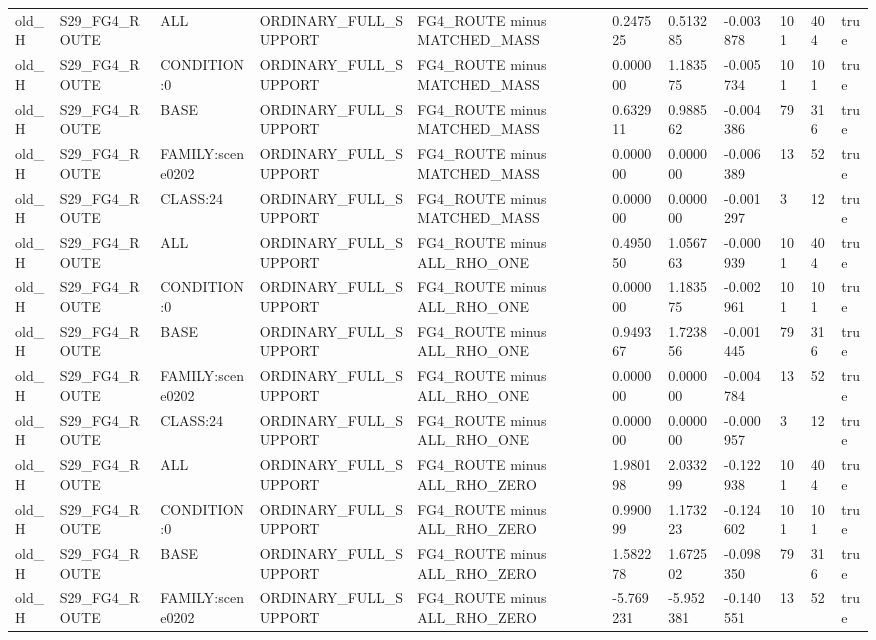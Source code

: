 \begin{tabular}{lllllllllll}
old\_H & S29\_FG4\_ROUTE & ALL & ORDINARY\_FULL\_SUPPORT & FG4\_ROUTE minus MATCHED\_MASS & 0.247525 & 0.513285 & -0.003878 & 101 & 404 & true \\
old\_H & S29\_FG4\_ROUTE & CONDITION:0 & ORDINARY\_FULL\_SUPPORT & FG4\_ROUTE minus MATCHED\_MASS & 0.000000 & 1.183575 & -0.005734 & 101 & 101 & true \\
old\_H & S29\_FG4\_ROUTE & BASE & ORDINARY\_FULL\_SUPPORT & FG4\_ROUTE minus MATCHED\_MASS & 0.632911 & 0.988562 & -0.004386 & 79 & 316 & true \\
old\_H & S29\_FG4\_ROUTE & FAMILY:scene0202 & ORDINARY\_FULL\_SUPPORT & FG4\_ROUTE minus MATCHED\_MASS & 0.000000 & 0.000000 & -0.006389 & 13 & 52 & true \\
old\_H & S29\_FG4\_ROUTE & CLASS:24 & ORDINARY\_FULL\_SUPPORT & FG4\_ROUTE minus MATCHED\_MASS & 0.000000 & 0.000000 & -0.001297 & 3 & 12 & true \\
old\_H & S29\_FG4\_ROUTE & ALL & ORDINARY\_FULL\_SUPPORT & FG4\_ROUTE minus ALL\_RHO\_ONE & 0.495050 & 1.056763 & -0.000939 & 101 & 404 & true \\
old\_H & S29\_FG4\_ROUTE & CONDITION:0 & ORDINARY\_FULL\_SUPPORT & FG4\_ROUTE minus ALL\_RHO\_ONE & 0.000000 & 1.183575 & -0.002961 & 101 & 101 & true \\
old\_H & S29\_FG4\_ROUTE & BASE & ORDINARY\_FULL\_SUPPORT & FG4\_ROUTE minus ALL\_RHO\_ONE & 0.949367 & 1.723856 & -0.001445 & 79 & 316 & true \\
old\_H & S29\_FG4\_ROUTE & FAMILY:scene0202 & ORDINARY\_FULL\_SUPPORT & FG4\_ROUTE minus ALL\_RHO\_ONE & 0.000000 & 0.000000 & -0.004784 & 13 & 52 & true \\
old\_H & S29\_FG4\_ROUTE & CLASS:24 & ORDINARY\_FULL\_SUPPORT & FG4\_ROUTE minus ALL\_RHO\_ONE & 0.000000 & 0.000000 & -0.000957 & 3 & 12 & true \\
old\_H & S29\_FG4\_ROUTE & ALL & ORDINARY\_FULL\_SUPPORT & FG4\_ROUTE minus ALL\_RHO\_ZERO & 1.980198 & 2.033299 & -0.122938 & 101 & 404 & true \\
old\_H & S29\_FG4\_ROUTE & CONDITION:0 & ORDINARY\_FULL\_SUPPORT & FG4\_ROUTE minus ALL\_RHO\_ZERO & 0.990099 & 1.173223 & -0.124602 & 101 & 101 & true \\
old\_H & S29\_FG4\_ROUTE & BASE & ORDINARY\_FULL\_SUPPORT & FG4\_ROUTE minus ALL\_RHO\_ZERO & 1.582278 & 1.672502 & -0.098350 & 79 & 316 & true \\
old\_H & S29\_FG4\_ROUTE & FAMILY:scene0202 & ORDINARY\_FULL\_SUPPORT & FG4\_ROUTE minus ALL\_RHO\_ZERO & -5.769231 & -5.952381 & -0.140551 & 13 & 52 & true \\

\end{tabular}
